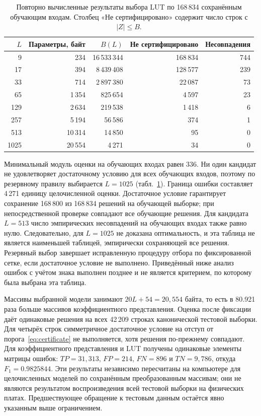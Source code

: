 \begin{table}[t]
\caption{Повторно вычисленные результаты выбора LUT по 168\,834 сохранённым обучающим входам. Столбец «Не сертифицировано» содержит число строк с $|Z|\leq B$.}
\label{tab:lut}
\centering\footnotesize\setlength{\tabcolsep}{4pt}
\begin{tabular}{rrrrr}
\toprule
$L$ & Параметры, байт & $B(L)$ & Не сертифицировано & Несовпадения\\
\midrule
9 & 234 & 16\,533\,344 & 168\,834 & 744\\
17 & 394 & 8\,439\,408 & 128\,577 & 239\\
33 & 714 & 2\,897\,380 & 22\,087 & 73\\
65 & 1\,354 & 825\,654 & 4\,597 & 23\\
129 & 2\,634 & 219\,538 & 1\,418 & 6\\
257 & 5\,194 & 56\,586 & 374 & 1\\
513 & 10\,314 & 14\,850 & 95 & 0\\
1025 & 20\,554 & 4\,271 & 34 & 0\\
\bottomrule
\end{tabular}
\end{table}

Минимальный модуль оценки на обучающих входах равен 336. Ни один кандидат не удовлетворяет достаточному условию для всех обучающих входов, поэтому по резервному правилу выбирается $L=1025$ (табл.~\ref{tab:lut}). Граница ошибки составляет 4\,271 единицу целочисленной оценки. Достаточное условие гарантирует сохранение 168\,800 из 168\,834 решений на обучающей выборке; при непосредственной проверке совпадают все обучающие решения. Для кандидата $L=513$ число эмпирических несовпадений на обучающих входах также равно нулю. Следовательно, для $L=1025$ не доказана оптимальность, и эта таблица не является наименьшей таблицей, эмпирически сохраняющей все решения. Резервный выбор завершает исправленную процедуру отбора по фиксированной сетке, если достаточное условие не выполнено. Приведённый ниже анализ ошибок с учётом знака выполнен позднее и не является критерием, по которому была выбрана эта таблица.

Массивы выбранной модели занимают $20L+54=20,554$ байта, то есть в 80.921 раза больше массивов коэффициентного представления. Оценка после фиксации даёт одинаковые решения на всех 42\,209 строках канонической тестовой выборки. Для четырёх строк симметричное достаточное условие на отступ от порога~\eqref{eq:certificate} не выполняется, хотя решения по-прежнему совпадают. Для коэффициентного представления и LUT получены одинаковые элементы матрицы ошибок: $TP=31,313$, $FP=214$, $FN=896$ и $TN=9,786$, откуда $F_1=0.9825844$. Эти результаты независимо пересчитаны на компьютере для целочисленных моделей по сохранённым преобразованным массивам; они не являются результатом воспроизведения всей тестовой выборки на физических платах. Предшествующее обращение к тестовым данным остаётся явно указанным выше ограничением.

